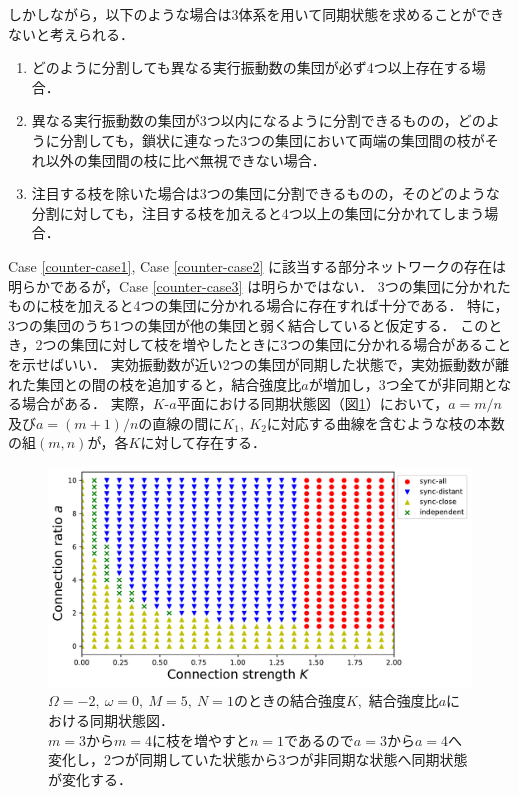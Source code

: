 \documentclass[../main]{subfiles}
\begin{document}
しかしながら，以下のような場合は3体系を用いて同期状態を求めることができないと考えられる．
\renewcommand{\labelenumi}{Case \theenumi}
\begin{enumerate}
    \item \label{counter-case1} 
    どのように分割しても異なる実行振動数の集団が必ず4つ以上存在する場合．
    \item \label{counter-case2}
    異なる実行振動数の集団が3つ以内になるように分割できるものの，どのように分割しても，鎖状に連なった3つの集団において両端の集団間の枝がそれ以外の集団間の枝に比べ無視できない場合．
    \item \label{counter-case3}
    注目する枝を除いた場合は3つの集団に分割できるものの，そのどのような分割に対しても，注目する枝を加えると4つ以上の集団に分かれてしまう場合．
\end{enumerate}

Case \ref{counter-case1}, Case \ref{counter-case2} に該当する部分ネットワークの存在は明らかであるが，Case \ref{counter-case3} は明らかではない．
3つの集団に分かれたものに枝を加えると4つの集団に分かれる場合に存在すれば十分である．
特に，3つの集団のうち1つの集団が他の集団と弱く結合していると仮定する．
このとき，2つの集団に対して枝を増やしたときに3つの集団に分かれる場合があることを示せばいい．
実効振動数が近い2つの集団が同期した状態で，実効振動数が離れた集団との間の枝を追加すると，結合強度比$a$が増加し，3つ全てが非同期となる場合がある．
実際，$K$-$a$平面における同期状態図（図\ref{fig:3body-phase-m5}）において，$a=m/n$及び$a=(m+1)/n$の直線の間に$K_1,\ K_2$に対応する曲線を含むような枝の本数の組$(m,n)$が，各$K$に対して存在する．

\begin{figure}[tbp]
    \centering
    \includegraphics[width=135mm]{./images/three-body-phase-m5.pdf}
    \centering
    \caption{$\Omega=-2,\ \omega=0,\ M=5,\ N=1$のときの結合強度$K$,\ 結合強度比$a$における同期状態図．\\
    $m=3$から$m=4$に枝を増やすと$n=1$であるので$a=3$から$a=4$へ変化し，2つが同期していた状態から3つが非同期な状態へ同期状態が変化する．}
    \label{fig:3body-phase-m5}
\end{figure}
\end{document}
